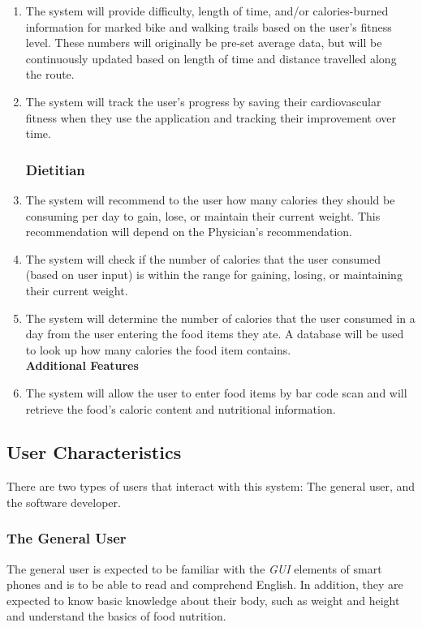 \documentclass[12pt,letterpaper]{article}
\begin{document}
\begin{enumerate}[{F}1. ]
\item The system will provide difficulty, length of time, and/or calories-burned information for marked bike and walking trails based on the user's fitness level. These numbers will originally be pre-set average data, but will be continuously updated based on length of time and distance travelled along the route.

\item The system will track the user's progress by saving their cardiovascular fitness when they use the application and tracking their improvement over time.


\subsubsection{Dietitian}
\item The system will recommend to the user how many calories they should be consuming per day to gain, lose, or maintain their current weight. This recommendation will depend on the Physician's recommendation.

\item The system will check if the number of calories that the user consumed (based on user input) is within the range for gaining, losing, or maintaining their current weight.

\item The system will determine the number of calories that the user consumed in a day from the user entering the food items they ate. A database will be used to look up how many calories the food item contains.\\ 

\textbf{Additional Features}
\item The system will allow the user to enter food items by bar code scan and will retrieve the food's caloric content and nutritional information.
\end{enumerate}

\subsection{User Characteristics}
There are two types of users that interact with this system: The general user, and the software developer.\\

\subsubsection{The General User}
\indent The general user is expected to be familiar with the \textit{GUI} elements of smart phones and is to be able to read and comprehend English. In addition, they are expected to know basic knowledge about their body, such as weight and height and understand the basics of food nutrition.
\end{document}

